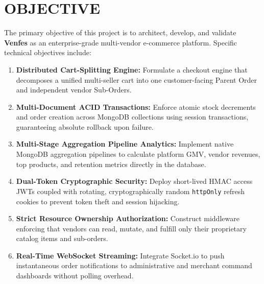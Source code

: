 \documentclass[12pt,a4paper]{report}
\begin{document}
\section{OBJECTIVE}
The primary objective of this project is to architect, develop, and validate \textbf{Venfes} as an enterprise-grade multi-vendor e-commerce platform. Specific technical objectives include:
\begin{enumerate}[leftmargin=1.5cm]
    \item \textbf{Distributed Cart-Splitting Engine:} Formulate a checkout engine that decomposes a unified multi-seller cart into one customer-facing Parent Order and independent vendor Sub-Orders.
    \item \textbf{Multi-Document ACID Transactions:} Enforce atomic stock decrements and order creation across MongoDB collections using session transactions, guaranteeing absolute rollback upon failure.
    \item \textbf{Multi-Stage Aggregation Pipeline Analytics:} Implement native MongoDB aggregation pipelines to calculate platform GMV, vendor revenues, top products, and retention metrics directly in the database.
    \item \textbf{Dual-Token Cryptographic Security:} Deploy short-lived HMAC access JWTs coupled with rotating, cryptographically random \texttt{httpOnly} refresh cookies to prevent token theft and session hijacking.
    \item \textbf{Strict Resource Ownership Authorization:} Construct middleware enforcing that vendors can read, mutate, and fulfill only their proprietary catalog items and sub-orders.
    \item \textbf{Real-Time WebSocket Streaming:} Integrate Socket.io to push instantaneous order notifications to administrative and merchant command dashboards without polling overhead.
\end{enumerate}
\end{document}
